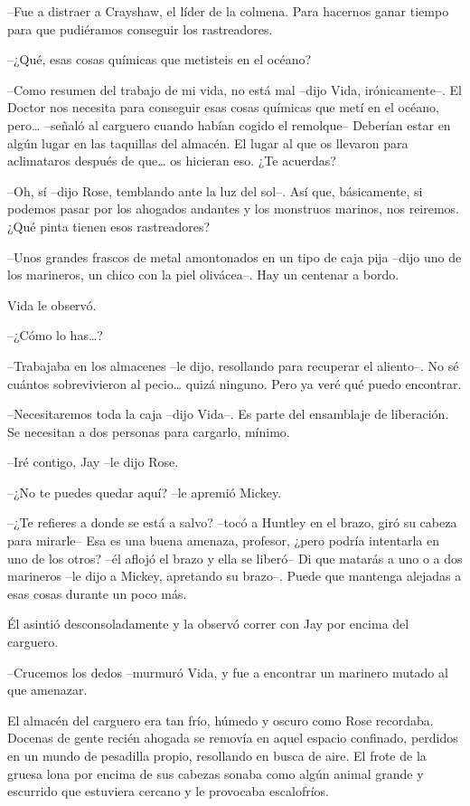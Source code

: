 {--Fue a distraer a Crayshaw, el líder de la colmena. Para hacernos
ganar tiempo para que pudiéramos conseguir los rastreadores.}

{--¿Qué, esas cosas químicas que metisteis en el océano?}

{--Como resumen del trabajo de mi vida, no está mal --dijo Vida,
 irónicamente--. El Doctor nos necesita para conseguir esas cosas
 químicas que metí en el océano, pero\ldots{} --señaló al carguero cuando
 habían cogido el remolque-- Deberían estar en algún lugar en las
 taquillas del almacén. El lugar al que os llevaron para aclimataros
 después de que\ldots{} os hicieran eso. ¿Te acuerdas?}

{--Oh, sí --dijo Rose, temblando ante la luz del sol--. Así que,
 básicamente, si podemos pasar por los ahogados andantes y los monstruos
marinos, nos reiremos. ¿Qué pinta tienen esos rastreadores?}

{--Unos grandes frascos de metal amontonados en un tipo de caja pija
 --dijo uno de los marineros, un chico con la piel olivácea--. Hay un
centenar a bordo.}

{Vida le observó.}

{--¿Cómo lo has\ldots{}?}

{--Trabajaba en los almacenes --le dijo, resollando para recuperar el
 aliento--. No sé cuántos sobrevivieron al pecio\ldots{} quizá ninguno.
Pero ya veré qué puedo encontrar.}

{--Necesitaremos toda la caja --dijo Vida--. Es parte del ensamblaje de
liberación. Se necesitan a dos personas para cargarlo, mínimo.}

{--Iré contigo, Jay --le dijo Rose.}

{--¿No te puedes quedar aquí? --le apremió Mickey.}

{--¿Te refieres a donde se está a salvo? --tocó a Huntley en el brazo,
 giró su cabeza para mirarle-- Esa es una buena amenaza, profesor, ¿pero
 podría intentarla en uno de los otros? --él aflojó el brazo y ella se
 liberó-- Di que matarás a uno o a dos marineros --le dijo a Mickey,
 apretando su brazo--. Puede que mantenga alejadas a esas cosas durante
un poco más.}

{Él asintió desconsoladamente y la observó correr con Jay por encima del
carguero.}

{--Crucemos los dedos --murmuró Vida, y fue a encontrar un marinero
mutado al que amenazar.}

\mbox{}

{El almacén del carguero era tan frío, húmedo y oscuro como Rose
 recordaba. Docenas de gente recién ahogada se removía en aquel espacio
 confinado, perdidos en un mundo de pesadilla propio, resollando en busca
 de aire. El frote de la gruesa lona por encima de sus cabezas sonaba
 como algún animal grande y escurrido que estuviera cercano y le
provocaba escalofríos.}

